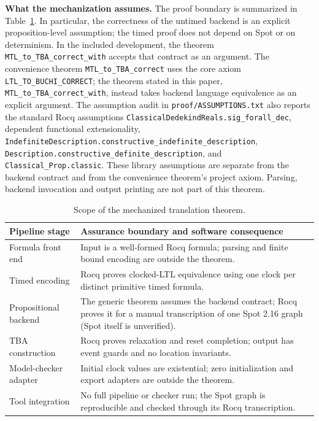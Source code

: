 \documentclass[10pt,journal,compsoc]{IEEEtran}
\newcommand{\runinhead}[1]{\par\smallskip\noindent\textbf{#1}\enspace}
\begin{document}
\runinhead{What the mechanization assumes.}
The proof boundary is summarized in Table~\ref{tab:proof-boundary}. In
particular, the correctness of the untimed backend is an explicit
proposition-level assumption; the timed proof does not depend on Spot or on
determinism. In the included development, the theorem
\texttt{MTL\_to\_TBA\_correct\_with} accepts that contract as an argument.
The convenience theorem \texttt{MTL\_to\_TBA\_correct} uses the core axiom
\texttt{LTL\_TO\_BUCHI\_CORRECT}; the theorem stated in this paper,
\texttt{MTL\_to\_TBA\_correct\_with}, instead takes backend language
equivalence as an explicit argument. The assumption audit in
\texttt{proof/ASSUMPTIONS.txt} also reports the standard Rocq assumptions
\texttt{ClassicalDedekindReals.\allowbreak{}sig\_forall\_dec}, dependent
functional extensionality,
\texttt{IndefiniteDescription.\allowbreak{}constructive\_\allowbreak{}indefinite\_\allowbreak{}description},
\texttt{Description.\allowbreak{}constructive\_\allowbreak{}definite\_\allowbreak{}description},
and \texttt{Classical\_Prop.classic}. These library assumptions are separate
from the backend contract and from the convenience theorem's project axiom.
Parsing, backend invocation and output printing are not part of this theorem.
\begin{table}[t]
\centering
\caption{Scope of the mechanized translation theorem.}
\label{tab:proof-boundary}
\footnotesize
\begin{tabular}{@{}p{}p{}@{}}
\toprule
Pipeline stage & Assurance boundary and software consequence\\
\midrule
Formula front end & Input is a well-formed Rocq formula; parsing and finite bound encoding are outside the theorem.\\
Timed encoding & Rocq proves clocked-LTL equivalence using one clock per distinct primitive timed formula.\\
Propositional backend & The generic theorem assumes the backend contract; Rocq proves it for a manual transcription of one Spot 2.16 graph (Spot itself is unverified).\\
TBA construction & Rocq proves relaxation and reset completion; output has event guards and no location invariants.\\
Model-checker adapter & Initial clock values are existential; zero initialization and export adapters are outside the theorem.\\
Tool integration & No full pipeline or checker run; the Spot graph is reproducible and checked through its Rocq transcription.\\
\bottomrule
\end{tabular}
\end{table}
\end{document}
